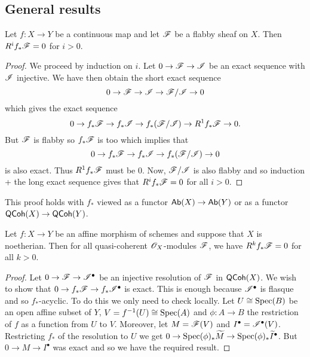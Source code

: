\documentclass{memoir}
\begin{document}
\subsection{General results}
\begin{proposition}
    Let $f:X\to Y$ be a continuous map and let $\mathscr{F}$ be a flabby sheaf on $X$.
    Then $R^if_*\mathscr{F} = 0$ for $i>0$.
\end{proposition}
\begin{proof}
    We proceed by induction on $i$.
    Let $0\to \mathscr{F}\to \mathscr{I}$ be an exact sequence with $\mathscr{I}$ injective.
    We have then obtain the short exact sequence
    \begin{equation}
        0 \to \mathscr{F}\to \mathscr{I} \to \mathscr{F}/\mathscr{I} \to 0
    \end{equation}
    which gives the exact sequence
    \begin{equation}
        0 \to f_*\mathscr{F}\to f_*\mathscr{I} \to f_*(\mathscr{F}/\mathscr{I}) \to R^1f_*\mathscr{F} \to 0.
    \end{equation}
    But $\mathscr{F}$ is flabby so $f_*\mathscr{F}$ is too which implies that 
    \begin{equation}
        0 \to f_*\mathscr{F}\to f_*\mathscr{I} \to f_*(\mathscr{F}/\mathscr{I}) \to 0
    \end{equation}
    is also exact.
    Thus $R^1f_*\mathscr{F}$ must be $0$.
    Now, $\mathscr{F}/\mathscr{I}$ is also flabby and so induction + the long exact sequence gives that $R^if_*\mathscr{F} = 0$ for all $i>0$.
\end{proof}
\begin{remark}
    This proof holds with $f_*$ viewed as a functor ${\normalfont\mathsf{Ab}}(X)\to {\normalfont\mathsf{Ab}}(Y)$ or as a functor ${\normalfont\mathsf{QCoh}}({X}) \to {\normalfont\mathsf{QCoh}}({Y})$.
\end{remark}
\begin{lemma}
    Let $f:X\to Y$ be an affine morphism of schemes and suppose that $X$ is noetherian.
    Then for all quasi-coherent $\mathscr{O}_X$-modules $\mathscr{F}$, we have $R^kf_*\mathscr{F} = 0$ for all $k>0$.
\end{lemma}
\begin{proof}
    Let $0\to \mathscr{F}\to \mathscr{I}^\bullet$ be an injective resolution of $\mathscr{F}$ in ${\normalfont\mathsf{QCoh}}({X})$.
    We wish to show that $0\to f_*\mathscr{F} \to f_*\mathscr{I}^\bullet$ is exact.
    This is enough because $\mathscr{I}^\bullet$ is flasque and so $f_*$-acyclic.
    To do this we only need to check locally.
    Let $U \cong \operatorname{Spec}(B)$ be an open affine subset of $Y$, $V = f^{-1}(U) \cong \operatorname{Spec}(A)$ and $\phi:A\to B$ the restriction of $f$ as a function from $U$ to $V$.
    Moreover, let $M = \mathscr{F}(V)$ and $I^\bullet = \mathscr{I}^\bullet (V)$.
    Restricting $f_*$ of the resolution to $U$ we get $0\to \operatorname{Spec}(\phi)_* \widetilde M\to \operatorname{Spec}(\phi)_*\widetilde I^\bullet$.
    But $0\to M\to I^\bullet$ was exact and so we have the required result.
\end{proof}
\end{document}
